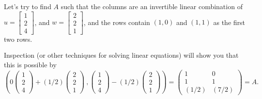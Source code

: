 \documentclass[11pt]{article}
\begin{document}
\begin{enumerate}
Let's try to find $A$ such that the columns are an invertible linear combination of $u = \begin{bmatrix} 1 \\ 2 \\ 4 \end{bmatrix}$, and $w=\begin{bmatrix} 2 \\ 2 \\ 1 \end{bmatrix}$, and the rows contain $(1,0)$ and $(1,1)$ as the first two rows.

Inspection (or other techniques for solving linear equations) will show you that this is possible by
\[\left(0 \begin{pmatrix} 1 \\ 2 \\ 4 \end{pmatrix} + (1/2) \begin{pmatrix} 2 \\ 2 \\ 1 \end{pmatrix} \ ,  \begin{pmatrix} 1 \\ 2 \\ 4 \end{pmatrix} - (1/2) \begin{pmatrix} 2 \\ 2 \\ 1 \end{pmatrix} \right) = \begin{pmatrix} 1 & 0 \\ 1 & 1 \\ (1/2) & (7/2) \end{pmatrix} = A. \]


\end{enumerate}
\end{document}
